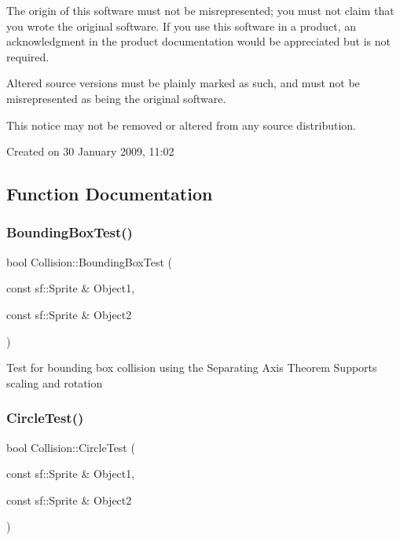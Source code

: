 \begin{DoxyEnumerate}
\item The origin of this software must not be misrepresented; you must not claim that you wrote the original software. If you use this software in a product, an acknowledgment in the product documentation would be appreciated but is not required.
\item Altered source versions must be plainly marked as such, and must not be misrepresented as being the original software.
\item This notice may not be removed or altered from any source distribution.

Created on 30 January 2009, 11\+:02 
\end{DoxyEnumerate}

\subsection{Function Documentation}
\mbox{\label{namespace_collision_a6f5945d467e629017010b139062919c6}} 
\subsubsection{\texorpdfstring{BoundingBoxTest()}{BoundingBoxTest()}}
{\footnotesize\ttfamily bool Collision\+::\+Bounding\+Box\+Test (\begin{DoxyParamCaption}\item[{const sf\+::\+Sprite \&}]{Object1,  }\item[{const sf\+::\+Sprite \&}]{Object2 }\end{DoxyParamCaption})}

Test for bounding box collision using the Separating Axis Theorem Supports scaling and rotation \mbox{\label{namespace_collision_af2f8835beee81b76d04311c794c36c0f}} 
\subsubsection{\texorpdfstring{CircleTest()}{CircleTest()}}
{\footnotesize\ttfamily bool Collision\+::\+Circle\+Test (\begin{DoxyParamCaption}\item[{const sf\+::\+Sprite \&}]{Object1,  }\item[{const sf\+::\+Sprite \&}]{Object2 }\end{DoxyParamCaption})}

